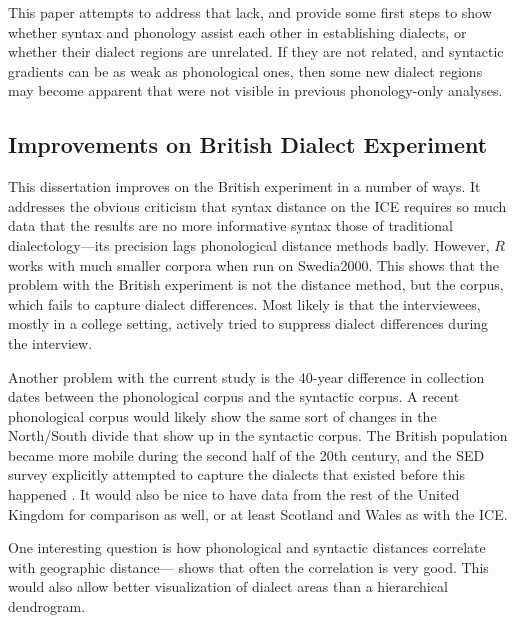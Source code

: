 This paper attempts to address that lack, and provide some first steps
to show whether syntax and phonology assist each other in establishing
dialects, or whether their dialect regions are unrelated. If they are not
related, and syntactic gradients can be as weak as phonological ones,
then some new dialect regions may become apparent that were not visible in
previous phonology-only analyses.

\subsection{Improvements on British Dialect Experiment}

This dissertation improves on the British experiment in a number of
ways. It addresses the obvious criticism that syntax distance on the
ICE requires so much data that the results are no more informative
syntax those of traditional dialectology---its precision lags
phonological distance methods badly. However, $R$ works with much
smaller corpora when run on Swedia2000. This shows that the problem
with the British experiment is not the distance method, but the
corpus, which fails to capture dialect differences. Most likely is
that the interviewees, mostly in a college setting, actively tried to
suppress dialect differences during the interview.

Another problem with the current study is the 40-year difference in
collection dates between the phonological corpus and the syntactic
corpus. A recent phonological corpus would likely show the same sort
of changes in the North/South divide that show up in the syntactic
corpus. The British population became more mobile during the second
half of the 20th century, and the SED survey explicitly attempted to capture
the dialects that existed before this happened \cite{orton78}.
It would also be nice to have data from the rest of the United Kingdom for
comparison as well, or at least Scotland and Wales as with the ICE.



One interesting question is
how phonological and syntactic distances correlate with geographic
distance--- shows that often the correlation is
very good. This would also allow better visualization of dialect areas
than a hierarchical dendrogram.

